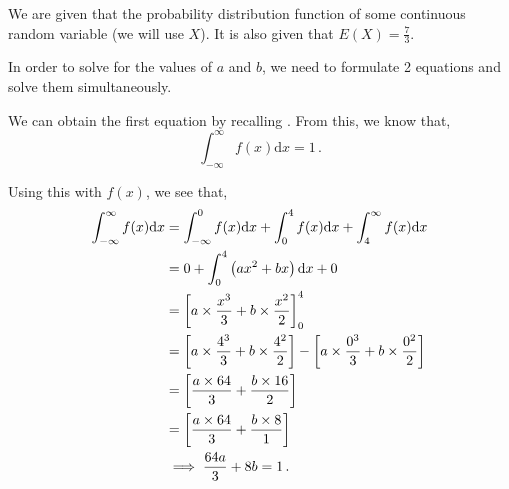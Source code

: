 %
%


\begin{subquestions}
	
\subquestion
We are given that the probability distribution function of some continuous random variable (we will use $X$). It is also given that $E(X) = \frac{7}{3}$. 
\begin{subsubquestions}
	
\subsubquestion
	
In order to solve for the values of $a$ and $b$, we need to formulate 2 equations and solve them simultaneously. 

We can obtain the first equation by recalling . From this, we know that,
\begin{equation}
	\int_{-\infty}^{\infty} f(x)\mathrm{d}x = 1 \,.
\end{equation}	
	
Using this with $f(x)$, we see that,
\begin{align}
	\int_{-\infty}^{\infty} f(x)\mathrm{d}x & = \int_{-\infty}^{0} f(x)\mathrm{d}x + \int_{0}^{4}f(x) \mathrm{d}x + \int_{4}^{\infty} f(x)\mathrm{d}x \nonumber \\
	& = 0 + \int_{0}^{4}\left(ax^2 + bx \right)\mathrm{d}x + 0 \nonumber \\
	                                & = \left[a \times \frac{x^3}{3} + b \times \frac{x^2}{2}\right]^{4}_{0} \nonumber \\
	                                & = \left[a \times \frac{4^3}{3} + b \times \frac{4^2}{2}\right] - \left[a \times \frac{0^3}{3} + b \times \frac{0^2}{2}\right] \nonumber \\
	                                & = \left[\frac{a \times 64}{3} + \frac{b \times 16}{2}\right] \nonumber \\
	                                & = \left[\frac{a \times 64}{3} + \frac{b \times 8}{1}\right] \nonumber \\
	                                & \implies \frac{64a}{3} + 8b = 1 \,. \label{2012:q3:CRV1}           
\end{align}


\end{subsubquestions}
\end{subquestions}
